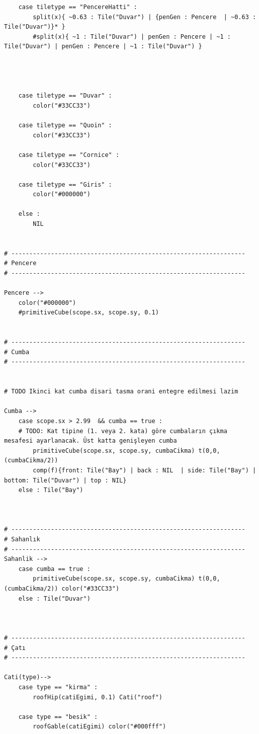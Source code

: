 \documentclass[12pt,turkish,a4paperpaper,]{report}
\begin{document}
\begin{verbatim}
    case tiletype == "PencereHatti" :
        split(x){ ~0.63 : Tile("Duvar") | {penGen : Pencere  | ~0.63 : Tile("Duvar")}* }
        #split(x){ ~1 : Tile("Duvar") | penGen : Pencere | ~1 : Tile("Duvar") | penGen : Pencere | ~1 : Tile("Duvar") }




    case tiletype == "Duvar" :
        color("#33CC33")

    case tiletype == "Quoin" :
        color("#33CC33")

    case tiletype == "Cornice" :
        color("#33CC33")

    case tiletype == "Giris" :
        color("#000000")

    else :
        NIL


# -----------------------------------------------------------------
# Pencere
# -----------------------------------------------------------------

Pencere -->
    color("#000000")
    #primitiveCube(scope.sx, scope.sy, 0.1)


# -----------------------------------------------------------------
# Cumba
# -----------------------------------------------------------------


# TODO Ikinci kat cumba disari tasma orani entegre edilmesi lazim

Cumba -->
    case scope.sx > 2.99  && cumba == true :
    # TODO: Kat tipine (1. veya 2. kata) göre cumbaların çıkma mesafesi ayarlanacak. Üst katta genişleyen cumba
        primitiveCube(scope.sx, scope.sy, cumbaCikma) t(0,0, (cumbaCikma/2))
        comp(f){front: Tile("Bay") | back : NIL  | side: Tile("Bay") | bottom: Tile("Duvar") | top : NIL}
    else : Tile("Bay")



# -----------------------------------------------------------------
# Sahanlık
# -----------------------------------------------------------------
Sahanlik -->
    case cumba == true :
        primitiveCube(scope.sx, scope.sy, cumbaCikma) t(0,0, (cumbaCikma/2)) color("#33CC33")
    else : Tile("Duvar")



# -----------------------------------------------------------------
# Çatı
# -----------------------------------------------------------------

Cati(type)-->
    case type == "kirma" :
        roofHip(catiEgimi, 0.1) Cati("roof")

    case type == "besik" :
        roofGable(catiEgimi) color("#000fff")


\end{verbatim}
\end{document}
